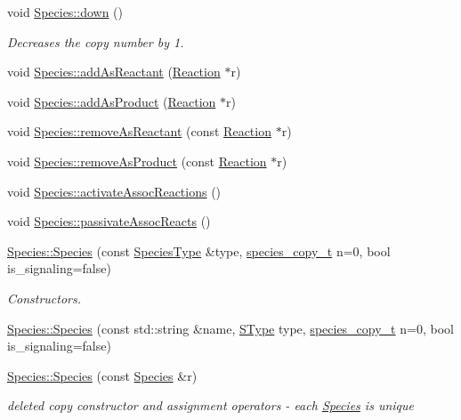 \begin{DoxyCompactItemize}
void \hyperlink{group__Chemistry_ga04880f9d575ca66ff33399ac0a2fb88e}{Species\-::down} ()
\begin{DoxyCompactList}\small\item\em Decreases the copy number by 1. \end{DoxyCompactList}\item 
void \hyperlink{group__Chemistry_ga6fee690741da9669da13f21c300a0874}{Species\-::add\-As\-Reactant} (\hyperlink{classReaction}{Reaction} $\ast$r)
\item 
void \hyperlink{group__Chemistry_ga081600e8a161f37b8598f85f426265d2}{Species\-::add\-As\-Product} (\hyperlink{classReaction}{Reaction} $\ast$r)
\item 
void \hyperlink{group__Chemistry_ga9878701daf45bb766200527375a0f6f4}{Species\-::remove\-As\-Reactant} (const \hyperlink{classReaction}{Reaction} $\ast$r)
\item 
void \hyperlink{group__Chemistry_gae37874775e33c9bd17918c1450d745fa}{Species\-::remove\-As\-Product} (const \hyperlink{classReaction}{Reaction} $\ast$r)
\item 
void \hyperlink{group__Chemistry_gaadeaff0f2f010bc820baf204c3822e6d}{Species\-::activate\-Assoc\-Reactions} ()
\item 
void \hyperlink{group__Chemistry_ga9b48b280ea3bd19adaf2432704355aa3}{Species\-::passivate\-Assoc\-Reacts} ()
\item 
\hyperlink{group__Chemistry_ga90b2a3cd0053605f7e10ab707f2d63b7}{Species\-::\-Species} (const \hyperlink{classSpeciesType}{Species\-Type} \&type, \hyperlink{common_8h_a3503f321fd36304ee274141275cca586}{species\-\_\-copy\-\_\-t} n=0, bool is\-\_\-signaling=false)
\begin{DoxyCompactList}\small\item\em Constructors. \end{DoxyCompactList}\item 
\hyperlink{group__Chemistry_gab6591cea94153ebb39f299ecb9080a40}{Species\-::\-Species} (const std\-::string \&name, \hyperlink{group__Chemistry_ga49104ff0a7d4118feb179c2f1c906f12}{S\-Type} type, \hyperlink{common_8h_a3503f321fd36304ee274141275cca586}{species\-\_\-copy\-\_\-t} n=0, bool is\-\_\-signaling=false)
\item 
\hyperlink{group__Chemistry_gacbe63ed697b577739bbb6e7e49cd9d3f}{Species\-::\-Species} (const \hyperlink{classSpecies}{Species} \&r)
\begin{DoxyCompactList}\small\item\em deleted copy constructor and assignment operators -\/ each \hyperlink{classSpecies}{Species} is unique \end{DoxyCompactList}\item 

\end{DoxyCompactItemize}
